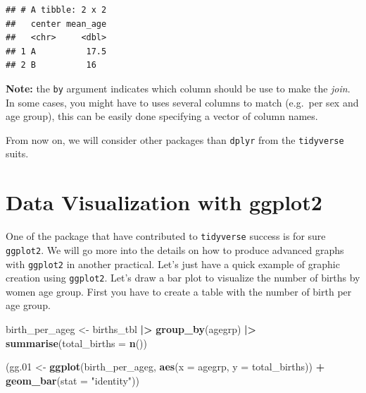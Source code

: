 \documentclass[
]{book}
\newenvironment{Shaded}{\begin{snugshade}}{\end{snugshade}}
\newcommand{\AttributeTok}[1]{\textcolor[rgb]{0.13,0.29,0.53}{#1}}
\newcommand{\FloatTok}[1]{\textcolor[rgb]{0.00,0.00,0.81}{#1}}
\newcommand{\FunctionTok}[1]{\textcolor[rgb]{0.13,0.29,0.53}{\textbf{#1}}}
\newcommand{\NormalTok}[1]{#1}
\newcommand{\OtherTok}[1]{\textcolor[rgb]{0.56,0.35,0.01}{#1}}
\newcommand{\SpecialCharTok}[1]{\textcolor[rgb]{0.81,0.36,0.00}{\textbf{#1}}}
\newcommand{\StringTok}[1]{\textcolor[rgb]{0.31,0.60,0.02}{#1}}
\begin{document}
\begin{verbatim}
## # A tibble: 2 x 2
##   center mean_age
##   <chr>     <dbl>
## 1 A          17.5
## 2 B          16
\end{verbatim}

\textbf{Note:} the \texttt{by} argument indicates which column should be use to make the \emph{join}. In some
cases, you might have to uses several columns to match (e.g.~per sex and age group), this
can be easily done specifying a vector of column names.

From now on, we will consider other packages than \texttt{dplyr} from the \texttt{tidyverse} suits.

\section{Data Visualization with ggplot2}\label{data-visualization-with-ggplot2}

One of the package that have contributed to \texttt{tidyverse} success is for sure \texttt{ggplot2}.
We will go more into the details on how to produce advanced graphs with \texttt{ggplot2} in another practical.
Let's just have a quick example of graphic creation using \texttt{ggplot2}.
Let's draw a bar plot to visualize the number of births by women age group.
First you have to create a table with the number of birth per age group.

\begin{Shaded}
\begin{Highlighting}[]
\NormalTok{birth\_per\_ageg }\OtherTok{\textless{}{-}}\NormalTok{ births\_tbl }\SpecialCharTok{|\textgreater{}}
  \FunctionTok{group\_by}\NormalTok{(agegrp) }\SpecialCharTok{|\textgreater{}}
  \FunctionTok{summarise}\NormalTok{(}\AttributeTok{total\_births =} \FunctionTok{n}\NormalTok{())}
\end{Highlighting}
\end{Shaded}

\begin{Shaded}
\begin{Highlighting}[]
\NormalTok{(gg}\FloatTok{.01} \OtherTok{\textless{}{-}}
  \FunctionTok{ggplot}\NormalTok{(birth\_per\_ageg, }\FunctionTok{aes}\NormalTok{(}\AttributeTok{x =}\NormalTok{ agegrp, }\AttributeTok{y =}\NormalTok{ total\_births)) }\SpecialCharTok{+}
  \FunctionTok{geom\_bar}\NormalTok{(}\AttributeTok{stat =} \StringTok{"identity"}\NormalTok{))}
\end{Highlighting}
\end{Shaded}
\end{document}
